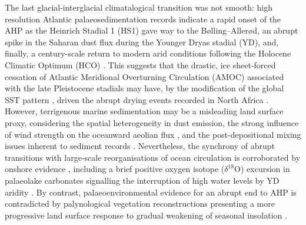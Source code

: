 \documentclass[a4paper]{article}
\newcommand{\delO}{\ensuremath{\delta ^{18}}O}
\begin{document}
The last glacial-interglacial climatalogical transition was not smooth: high resolution Atlantic palaeosedimentation records indicate a rapid onset of the AHP as the Heinrich Stadial 1 (HS1) gave way to the Bølling–Allerød, an abrupt spike in the Saharan dust flux during the Younger Dryas stadial (YD), and, finally, a century-scale return to modern arid conditions following the Holocene Climatic Optimum (HCO) \parencite{demenocal2000abrupt, kuhlmann2004transition, adkins2006african, mcgee2013magnitude, ehrmann2013dynamics, collins2013abrupt, williams2016glacial}.
This suggests that the drastic, ice sheet-forced cessation of Atlantic Meridional Overturning Circulation (AMOC) associated with the late Pleistocene stadials \parencite{mcmanus2004collapse, lynch2017atlantic, ritz2013estimated} may have, by the modification of the global SST pattern \parencite{boyle1987north, kiefer2005patterns, kienast2006eastern, barker2009interhemispheric}, driven the abrupt drying events recorded in North Africa \parencite{weldeab2007155, mulitza2008sahel, collins2013abrupt}. 
However, terrigenous marine sedimentation may be a misleading land surface proxy, considering the spatial heterogeneity in dust emission, the strong influence of wind strength on the oceanward aeolian flux \parencite{ruddiman1997tropical, mcgee2010gustiness, parker2016new}, and the post-depositional mixing issues inherent to sediment records \parencite{mahowald1999dust, giresse2003late, maslin2003evidence}.
Nevertheless, the synchrony of abrupt transitions with large-scale reorganisations of ocean circulation is corroborated by onshore evidence \parencite{gasse1994abrupt, garcin2007abrupt, talbot2007abrupt}, including a brief positive oxygen isotope (\delO) excursion in palaeolake carbonates signalling the interruption of high water levels by YD aridity \parencite{gasse1990arid}.
By contrast, palaeoenvironmental evidence for an abrupt end to AHP \parencite{gasse1990arid, salzmann2005dahomey, tierney2013abrupt, tierney2017rainfall} is contradicted by palynological vegetation reconstructions presenting a more progressive land surface response to gradual weakening of seasonal insolation \parencite{kropelin2008climate, lezine2009timing, vincens2010vegetation, amaral2013palynological, shanahan2015time}. 
\end{document}
